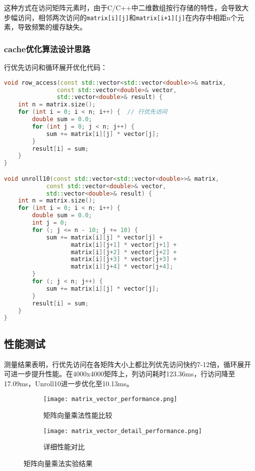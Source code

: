 \documentclass[a4paper,colorlinks=true,linkcolor=blue,urlcolor=blue,citecolor=green,bookmarks=true]{article}
\begin{document}
这种方式在访问矩阵元素时，由于C/C++中二维数组按行存储的特性，会导致大步幅访问，相邻两次访问的\verb|matrix[i][j]|和\verb|matrix[i+1][j]|在内存中相距n个元素，导致频繁的缓存缺失。

\subsubsection{cache优化算法设计思路}

行优先访问和循环展开优化代码：

\begin{lstlisting}[language=C++]
void row_access(const std::vector<std::vector<double>>& matrix, 
               const std::vector<double>& vector,
               std::vector<double>& result) {
    int n = matrix.size();
    for (int i = 0; i < n; i++) {  // 行优先访问
        double sum = 0.0;
        for (int j = 0; j < n; j++) {
            sum += matrix[i][j] * vector[j];
        }
        result[i] = sum;
    }
}

void unroll10(const std::vector<std::vector<double>>& matrix, 
            const std::vector<double>& vector,
            std::vector<double>& result) {
    int n = matrix.size();
    for (int i = 0; i < n; i++) {
        double sum = 0.0;
        int j = 0;
        for (; j <= n - 10; j += 10) {
            sum += matrix[i][j] * vector[j] +
                   matrix[i][j+1] * vector[j+1] +
                   matrix[i][j+2] * vector[j+2] +
                   matrix[i][j+3] * vector[j+3] +
                   matrix[i][j+4] * vector[j+4];
        }
        for (; j < n; j++) {
            sum += matrix[i][j] * vector[j];
        }
        result[i] = sum;
    }
}
\end{lstlisting}

\subsection{性能测试}

测量结果表明，行优先访问在各矩阵大小上都比列优先访问快约7-12倍，循环展开可进一步提升性能。在4000x4000矩阵上，列访问耗时123.36ms，行访问降至17.09ms，Unroll10进一步优化至10.13ms。

\begin{figure}[htbp]
  \centering
  \begin{subfigure}[b]{0.45\textwidth}
    \centering
    \texttt{[image: matrix\_vector\_performance.png]}
    \caption{矩阵向量乘法性能比较}
    \label{fig:matrix_vector_performance}
  \end{subfigure}
  \hfill
  \begin{subfigure}[b]{0.45\textwidth}
    \centering
    \texttt{[image: matrix\_vector\_detail\_performance.png]}
    \caption{详细性能对比}
    \label{fig:detail_performance}
  \end{subfigure}
  \caption{矩阵向量乘法实验结果}
  \label{fig:matrix_results}
\end{figure}
\end{document}

